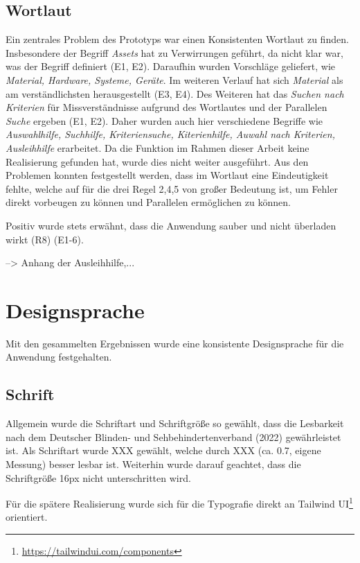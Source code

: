 \subsection{Wortlaut}
Ein zentrales Problem des Prototyps war einen Konsistenten Wortlaut zu finden. Insbesondere der
Begriff \textit{Assets} hat zu Verwirrungen geführt, da nicht klar war, was der Begriff definiert
(E1, E2). Daraufhin wurden Vorschläge geliefert, wie \textit{Material, Hardware, Systeme, Geräte}. Im
weiteren Verlauf hat sich \textit{Material} als am verständlichsten herausgestellt (E3, E4). Des
Weiteren hat das \textit{Suchen nach Kriterien} für Missverständnisse aufgrund des Wortlautes und
der Parallelen \textit{Suche} ergeben (E1, E2). Daher wurden auch hier verschiedene Begriffe wie
\textit{Auswahlhilfe, Suchhilfe, Kriteriensuche, Kiterienhilfe, Auwahl nach Kriterien, Ausleihhilfe}
erarbeitet. Da die Funktion im Rahmen dieser Arbeit keine Realisierung gefunden hat, wurde dies nicht
weiter ausgeführt. Aus den Problemen konnten festgestellt werden, dass im Wortlaut eine
Eindeutigkeit fehlte, welche auf für die drei Regel 2,4,5 von großer Bedeutung ist, um Fehler direkt
vorbeugen zu können und Parallelen ermöglichen zu können.

Positiv wurde stets erwähnt, dass die Anwendung sauber und nicht überladen wirkt (R8) (E1-6).

--> Anhang der Ausleihhilfe,...

\section{Designsprache}
Mit den gesammelten Ergebnissen wurde eine konsistente Designsprache für die Anwendung festgehalten.

\subsection{Schrift}
Allgemein wurde die Schriftart und Schriftgröße so gewählt, dass die Lesbarkeit nach dem Deutscher
Blinden- und Sehbehindertenverband (2022) gewährleistet ist. Als Schriftart wurde
XXX gewählt, welche durch XXX (ca. 0.7,
eigene Messung) besser lesbar ist. Weiterhin wurde darauf geachtet, dass die Schriftgröße
16px nicht unterschritten wird.

Für die spätere Realisierung wurde sich für die Typografie direkt an Tailwind
UI\footnote{\url{https://tailwindui.com/components}} orientiert.

